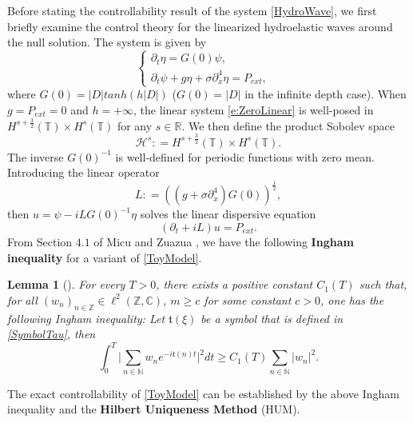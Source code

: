 \documentclass[12pt]{amsart}
\newtheorem{lemma}[theorem]{Lemma}
\theoremstyle{remark}
\theoremstyle{definition}
\numberwithin{equation}{section}
\newcommand{\p}{\partial}
\newcommand{\R}{\mathbb{R}}
\newcommand{\N}{\mathbb{N}}
\newcommand{\Z}{\mathbb{Z}}
\newcommand{\C}{\mathbb{C}}
\renewcommand{\H}{{\mathcal H }}
\newcommand{\f}{\frac}
\begin{document}
Before stating the controllability result of the system \eqref{HydroWave}, we first briefly examine the control theory for the linearized hydroelastic waves around the null solution. 
The system is given by 
\begin{equation}
\left\{
             \begin{array}{lr}
             \partial_t \eta  = G(0) \psi, &  \\
             \p_t \psi + g\eta  + \sigma \p_x^4 \eta = P_{ext},&
             \end{array}
\right.\label{e:ZeroLinear}
\end{equation}
where $G(0) = |D|tanh(h|D|)$ ($G(0) = |D|$ in the infinite depth case). 
When $g = P_{ext} = 0$ and $h = +\infty$, the linear system \eqref{e:ZeroLinear} is well-posed in $H^{s+\f32}(\mathbb{T}) \times H^s(\mathbb{T})$ for any $s \in \R$.
We then define the product Sobolev space
\begin{equation*}
    \H^s : = H^{s+\f32}(\mathbb{T}) \times H^s(\mathbb{T}).
\end{equation*}
The inverse $G(0)^{-1}$ is well-defined for periodic functions with zero mean.
Introducing the linear operator 
\begin{equation*}
    L : = ((g+\sigma\p_x^4)G(0))^{\f12},
\end{equation*}
then $u = \psi -i LG(0)^{-1} \eta$ solves the linear dispersive equation
\begin{equation} \label{ToyModel}
    (\p_t + iL) u = P_{ext}.
\end{equation}
From Section $4.1$ of Micu and Zuazua \cite{zbMATH05046349}, we have the following \textbf{Ingham inequality} for a variant of \eqref{ToyModel}.
\begin{lemma}[\hspace{1sp}\cite{zbMATH05046349}] \label{t:Ingham}
For every $T>0$, there exists a positive constant $C_1(T)$ such that, for all $(w_n)_{n\in \Z} \in \ell^2(\Z, \C)$, $m\geq c$ for some constant $c>0$, one has the following Ingham inequality: 
Let $\mathfrak{t}(\xi)$ be a symbol that is defined in \eqref{SymbolTau}, then
\begin{equation*} %
    \int_0^T \Big| \sum_{n\in \N} w_n e^{-i\mathfrak{t}(n)t}\Big|^2 dt \geq C_1(T)\sum_{n\in \N} |w_n|^2.
\end{equation*}
\end{lemma}
The exact controllability of \eqref{ToyModel} can be established by the above Ingham inequality and the \textbf{Hilbert Uniqueness Method} (HUM).
\end{document}
